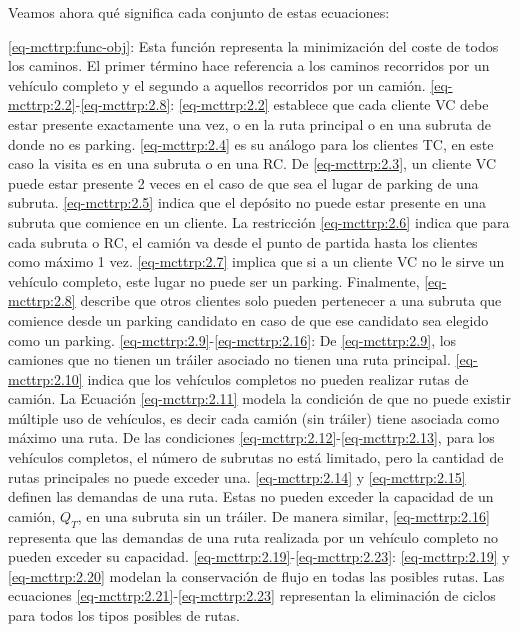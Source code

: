 Veamos ahora qué significa cada conjunto de estas ecuaciones:
\begin{itemize}
     \eqref{eq-mcttrp:func-obj}: Esta función representa la minimización del coste de todos los caminos. El primer término hace referencia a los caminos recorridos por un vehículo completo y el segundo a aquellos recorridos por un camión.
     \eqref{eq-mcttrp:2.2}-\eqref{eq-mcttrp:2.8}: \eqref{eq-mcttrp:2.2} establece que cada cliente VC debe estar presente exactamente una vez, o en la ruta principal o en una subruta de donde no es parking. \eqref{eq-mcttrp:2.4} es su análogo para los clientes TC, en este caso la visita es en una subruta o en una RC. De \eqref{eq-mcttrp:2.3}, un cliente VC puede estar presente 2 veces en el caso de que sea el lugar de parking de una subruta. \eqref{eq-mcttrp:2.5} indica que el depósito no puede estar presente en una subruta que comience en un cliente. La restricción \eqref{eq-mcttrp:2.6} indica que para cada subruta o RC, el camión va desde el punto de partida hasta los clientes como máximo 1 vez. \eqref{eq-mcttrp:2.7} implica que si a un cliente VC no le sirve un vehículo completo, este lugar no puede ser un parking. Finalmente, \eqref{eq-mcttrp:2.8} describe que otros clientes solo pueden pertenecer a una subruta que comience desde un parking candidato en caso de que ese candidato sea elegido como un parking.
     \eqref{eq-mcttrp:2.9}-\eqref{eq-mcttrp:2.16}: De \eqref{eq-mcttrp:2.9}, los camiones que no tienen un tráiler asociado no tienen una ruta principal. \eqref{eq-mcttrp:2.10} indica que los vehículos completos no pueden realizar rutas de camión. La Ecuación \eqref{eq-mcttrp:2.11} modela la condición de que no puede existir múltiple uso de vehículos, es decir cada camión (sin tráiler) tiene asociada como máximo una ruta. De las condiciones \eqref{eq-mcttrp:2.12}-\eqref{eq-mcttrp:2.13}, para los vehículos completos, el número de subrutas no está limitado, pero la cantidad de rutas principales no puede exceder una. \eqref{eq-mcttrp:2.14} y \eqref{eq-mcttrp:2.15} definen las demandas de una ruta. Estas no pueden exceder la capacidad de un camión, $Q_T$, en una subruta sin un tráiler. De manera similar, \eqref{eq-mcttrp:2.16} representa que las demandas de una ruta realizada por un vehículo completo no pueden exceder su capacidad.
     \eqref{eq-mcttrp:2.19}-\eqref{eq-mcttrp:2.23}: \eqref{eq-mcttrp:2.19} y \eqref{eq-mcttrp:2.20} modelan la conservación de flujo en todas las posibles rutas. Las ecuaciones \eqref{eq-mcttrp:2.21}-\eqref{eq-mcttrp:2.23} representan la eliminación de ciclos para todos los tipos posibles de rutas. 

\end{itemize}
